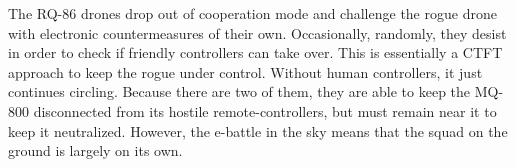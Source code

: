 The RQ-86 drones drop out of cooperation mode and challenge the rogue drone with electronic countermeasures of their own.
Occasionally, randomly, they desist in order to check if friendly controllers can take over.
This is essentially a CTFT approach to keep the rogue under control.
Without human controllers, it just continues circling.
Because there are two of them, they are able to keep the MQ-800 disconnected from its hostile remote-controllers, but must remain near it to keep it neutralized.
However, the e-battle in the sky means that the squad on the ground is largely on its own.